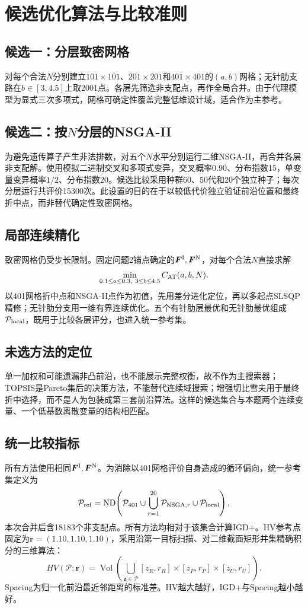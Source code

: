 \documentclass[UTF8,a4paper,11pt]{ctexart}
\begin{document}
\section{候选优化算法与比较准则}
\subsection{候选一：分层致密网格}
对每个合法$N$分别建立$101\times101$、$201\times201$和$401\times401$的$(a,b)$网格；无针肋支路在$b\in[3,4.5]$上取2001点。各层先筛选非支配点，再作全局合并。由于代理模型为显式三次多项式，网格可确定性覆盖完整低维设计域，适合作为主参考。

\subsection{候选二：按$N$分层的NSGA-II}
为避免遗传算子产生非法排数，对五个$N$水平分别运行二维NSGA-II，再合并各层非支配解。使用模拟二进制交叉和多项式变异，交叉概率0.90、分布指数15，单变量变异概率$1/2$、分布指数20。候选比较采用种群60、50代和20个独立种子；每次分层运行共评价15300次。此设置的目的在于以较低代价独立验证前沿位置和最终折中点，而非替代确定性致密网格。

\subsection{局部连续精化}
致密网格仍受步长限制。固定问题2锚点确定的$\bm F^{\rm I},\bm F^{\rm N}$，对每个合法$N$直接求解
\[
 \min_{0.1\le a\le0.3,\ 3\le b\le4.5}C_{\rm AT}(a,b,N).
\]
以401网格折中点和NSGA-II点作为初值，先用差分进化定位，再以多起点SLSQP精修；无针肋分支用一维有界连续优化。五个有针肋层最优和无针肋最优组成$\mathcal P_{\rm local}$，既用于比较各层评分，也进入统一参考集。

\subsection{未选方法的定位}
单一加权和可能遗漏非凸前沿，也不能展示完整权衡，故不作为主搜索器；TOPSIS是Pareto集后的决策方法，不能替代连续域搜索；增强切比雪夫用于最终折中选择，而不是人为包装成第三套前沿算法。这样的候选集合与本题两个连续变量、一个低基数离散变量的结构相匹配。

\subsection{统一比较指标}
所有方法使用相同$\bm F^{\rm I},\bm F^{\rm N}$。为消除以401网格评价自身造成的循环偏向，统一参考集定义为
\[
 \mathcal P_{\rm ref}=\operatorname{ND}\!\left(
 \mathcal P_{401}\cup\bigcup_{r=1}^{20}\mathcal P_{{\rm NSGA},r}
 \cup\mathcal P_{\rm local}\right),
\]
本次合并后含18183个非支配点。所有方法均相对于该集合计算IGD+。HV参考点固定为$\bm r=(1.10,1.10,1.10)$，采用沿第一目标扫描、对二维截面矩形并集精确积分的三维算法：
\[
HV(\mathcal P;\bm r)=\operatorname{Vol}\!\left(
\bigcup_{\bm z\in\mathcal P}[z_R,r_R]\times[z_P,r_P]\times[z_U,r_U]\right).
\]
Spacing为归一化前沿最近邻距离的标准差。HV越大越好，IGD+与Spacing越小越好。
\end{document}
